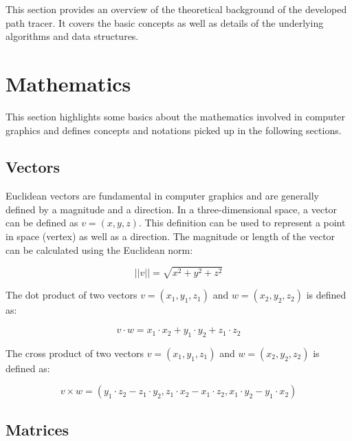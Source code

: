 
This section provides an overview of the theoretical background of the developed path tracer. It covers the basic concepts as well as details of the underlying algorithms and data structures.

\section{Mathematics}

This section highlights some basics about the mathematics involved in computer graphics and defines concepts and notations picked up in the following sections.

\subsection{Vectors}

Euclidean vectors are fundamental in computer graphics and are generally defined by a magnitude and a direction. In a three-dimensional space, a vector can be defined as $v = (x, y, z)$. This definition can be used to represent a point in space (vertex) as well as a direction. The magnitude or length of the vector can be calculated using the Euclidean norm:

\begin{equation}
  \label{eqn:euclidean-norm}
  ||v|| = \sqrt{x^2 + y^2 + z^2}
\end{equation}

The dot product of two vectors $v = (x_1, y_1, z_1)$ and $w = (x_2, y_2, z_2)$ is defined as:

\begin{equation}
  \label{eqn:dot-product}
  v \cdot w = x_1 \cdot x_2 + y_1 \cdot y_2 + z_1 \cdot z_2
\end{equation}

The cross product of two vectors $v = (x_1, y_1, z_1)$ and $w = (x_2, y_2, z_2)$ is defined as:

\begin{equation}
  \label{eqn:cross-product}
  v \times w = (y_1 \cdot z_2 - z_1 \cdot y_2, z_1 \cdot x_2 - x_1 \cdot z_2, x_1 \cdot y_2 - y_1 \cdot x_2)
\end{equation}

\subsection{Matrices}

